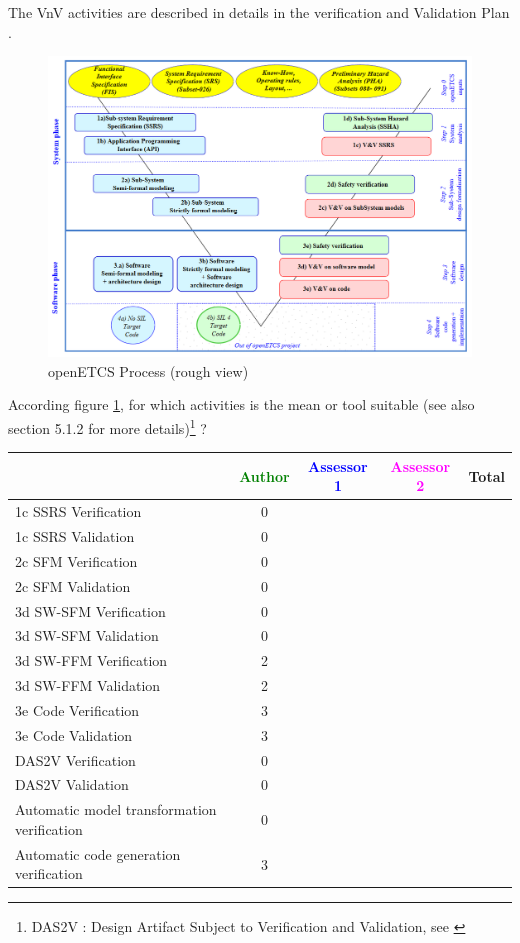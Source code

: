 The VnV activities are described in details in the verification and Validation Plan  \citep{D4.1}.

\begin{figure}[htb]
  \centering
  \includegraphics[width=.9\textwidth]{images/ProcessOpenETCS-BeM.png}
  \caption{openETCS Process (rough view)}
  \label{fig:frama-c-openETCSProcess}
\end{figure}

According figure \ref{fig:frama-c-openETCSProcess}, for which activities is the mean or tool suitable (see also \citep{D4.1} section 5.1.2 for more details)\footnote{DAS2V : Design Artifact Subject to Verification and Validation, see \citep{D4.1}} ?


\begin{tabular}{|l | c | c | c | c|}
\hline
& \textcolor{green}{Author} & \textcolor{blue}{Assessor 1} & \textcolor{magenta}{Assessor 2} & Total \\
\hline 
1c SSRS Verification & 0 & & &  \\
\hline
1c SSRS Validation & 0 & & &  \\
\hline
2c SFM Verification & 0 & & &  \\
\hline
2c SFM Validation & 0 & & &  \\
\hline
3d SW-SFM Verification & 0 & & &  \\
\hline
3d SW-SFM Validation & 0 & & &  \\
\hline
3d SW-FFM Verification & 2 & & &  \\
\hline
3d SW-FFM Validation & 2 & & &  \\
\hline
3e Code Verification & 3 & & &  \\
\hline
3e Code Validation & 3 & & &  \\
\hline
DAS2V Verification & 0 & & &  \\
\hline
DAS2V Validation & 0 & & &  \\
\hline
Automatic model transformation verification & 0 & & &  \\
\hline
Automatic code generation verification & 3 & & &  \\
\hline
\end{tabular}


